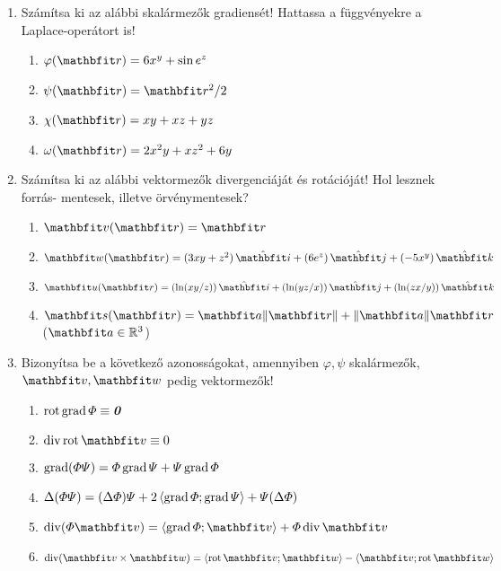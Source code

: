 \documentclass{szb-practice}
\begin{document}
\begin{enumerate}
  \item Számítsa ki az alábbi skalármezők gradiensét! Hattassa a függvényekre a
        Laplace-operátort is!
        \begin{enumerate}
          \item $\varphi(\coordvec) = 6x^y + \sin e^z$
          \item $\psi(\coordvec) = \coordvec^2 / 2$
          \item $\chi(\coordvec) = xy + xz + yz$
          \item $\omega(\coordvec) = 2 x^2 y + x z^2 + 6 y$
        \end{enumerate}

  \item Számítsa ki az alábbi vektormezők divergenciáját és rotációját!
        Hol lesznek forrás- mentesek, illetve örvénymentesek?
        \begin{enumerate}
          \item $\rvec v(\coordvec) = \coordvec$
          \item $\rvec w(\coordvec) = \ijk{3xy + z^2}{6 e^z}{-5 x^y}$
          \item $\rvec u(\coordvec) = \ijk{\ln(xy / z)}{\ln(yz / x)}{\ln(zx / y)}$
          \item $\rvec s(\coordvec) = \rvec a \| \coordvec \| + \| \rvec a \| \coordvec$
                \hfill ($\rvec a \in \Reals^3$)
        \end{enumerate}

  \item Bizonyítsa be a következő azonosságokat, amennyiben $\varphi, \psi$
        skalármezők, $\rvec v, \rvec w$ pedig vektormezők!
        \begin{enumerate}
          \item $\operatorname{rot} \operatorname{grad} \varPhi \equiv \text{\textbf{\textit{0}}}$
          \item $\Div \rot \rvec v \equiv 0$
          \item $\operatorname{grad} (\varPhi \varPsi) = \varPhi \operatorname{grad} \varPsi + \varPsi \operatorname{grad} \varPhi$
          \item $\Delta (\varPhi \varPsi) = (\Delta \varPhi) \varPsi + 2 \left\langle\operatorname{grad} \varPhi;\operatorname{grad} \varPsi\right\rangle + \varPsi (\Delta \varPhi)$
          \item $\Div (\varPhi \rvec v) = \scalar{\grad \varPhi}{\rvec v} + \varPhi \Div \rvec v$
          \item $\Div (\rvec v \times \rvec w) = \scalar{\rot \rvec v}{\rvec w} - \scalar{\rvec v}{\rot \rvec w}$
        \end{enumerate}


\end{enumerate}
\end{document}
